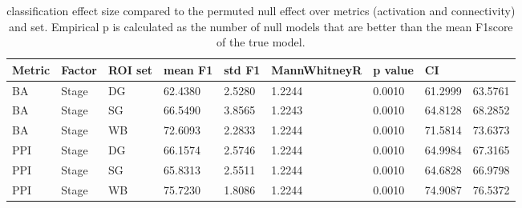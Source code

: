 \begin{table}
\centering
\begin{tabular}[0.2em]{@{}lllllllll@{}}\toprule
Metric & Factor & ROI set & mean F1 & std F1 & MannWhitneyR & p value & CI\\\toprule[0.2em]
BA & Stage & DG & 62.4380 & 2.5280 & 1.2244 & 0.0010 & 61.2999 & 63.5761 \\\midrule
BA & Stage & SG & 66.5490 & 3.8565 & 1.2243 & 0.0010 & 64.8128 & 68.2852 \\\midrule
BA & Stage & WB & 72.6093 & 2.2833 & 1.2244 & 0.0010 & 71.5814 & 73.6373 \\\midrule
PPI & Stage & DG & 66.1574 & 2.5746 & 1.2244 & 0.0010 & 64.9984 & 67.3165 \\\midrule
PPI & Stage & SG & 65.8313 & 2.5511 & 1.2244 & 0.0010 & 64.6828 & 66.9798 \\\midrule
PPI & Stage & WB & 75.7230 & 1.8086 & 1.2244 & 0.0010 & 74.9087 & 76.5372 \\\bottomrule[0.2em]
\end{tabular}
\caption{classification effect size compared to the permuted null effect over metrics (activation and connectivity) and set. Empirical p is calculated as the number of null models that are better than the mean F1score of the true model.\label{tabel:ClassificationEffectdomainbyload}}
\end{table}
